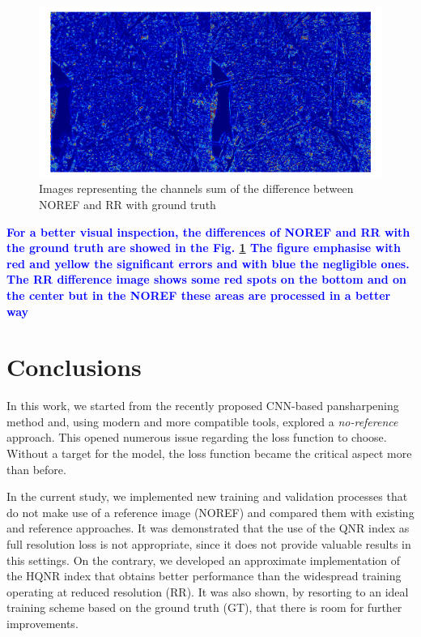 \documentclass[12pt]{report}
\newcommand{\bb}[1]{\textcolor{blue}{\textbf{#1}}}
\begin{document}
\begin{figure}
    \centering
    \includegraphics[scale=.35]{diff_PAN_NOREF_RR.png}
    \caption{Images representing the channels sum of the difference between NOREF and RR with ground truth}
    \label{fig:diffcolors}
\end{figure}

\bb{For a better visual inspection, the differences of NOREF and RR with the ground truth are showed in the Fig. \ref{fig:diffcolors}
The figure emphasise with red and yellow the significant errors and with blue the negligible ones.
The RR difference image shows some red spots on the bottom and on the center but in the NOREF these areas are processed in a better way}


\chapter*{Conclusions}
In this work, we started from the recently proposed \cite{pnn2} CNN-based pansharpening method and, using modern and more compatible tools, explored a \textit{no-reference} approach.
This opened numerous issue regarding the loss function to choose.
Without a target for the model, the loss function became the critical aspect more than before.

In the current study, we implemented new training and validation processes that do not make use of a reference image (NOREF) and compared them with existing and reference approaches. 
It was demonstrated that the use of the QNR index as full resolution loss is not appropriate, since it does not provide valuable results in this settings. On the contrary, we developed an approximate implementation of the HQNR index that obtains better performance than the widespread training operating at reduced resolution (RR). It was also shown, by resorting to an ideal training scheme based on the ground truth (GT), that there is room for further improvements. 
\end{document}
